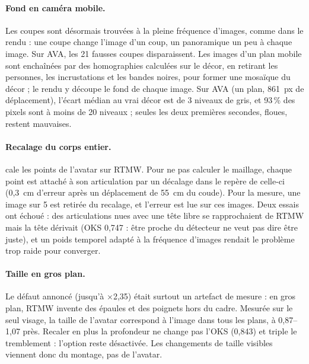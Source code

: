 \documentclass[11pt,a4paper]{report}
\newcommand{\code}[1]{\texttt{\detokenize{#1}}}
\begin{document}
\paragraph{Fond en caméra mobile.} Les coupes sont désormais trouvées à la pleine fréquence d'images, comme dans le rendu : une coupe
change l'image d'un coup, un panoramique un peu à chaque image. Sur AVA, les 21 fausses coupes disparaissent. Les images d'un plan mobile
sont enchaînées par des homographies calculées sur le décor, en retirant les personnes, les incrustations et les bandes noires, pour
former une mosaïque du décor ; le rendu y découpe le fond de chaque image. Sur AVA (un plan, 861~px de déplacement), l'écart médian au
vrai décor est de 3 niveaux de gris, et 93\,\% des pixels sont à moins de 20 niveaux ; seules les deux premières secondes, floues,
restent mauvaises.

\paragraph{Recalage du corps entier.} \code{body_refit.py} cale les points de l'avatar sur RTMW. Pour ne pas calculer le maillage,
chaque point est attaché à son articulation par un décalage dans le repère de celle-ci (0,3~cm d'erreur après un déplacement de 55~cm
du coude). Pour la mesure, une image sur 5 est retirée du recalage, et l'erreur est lue sur ces images. Deux essais ont échoué : des
articulations nues avec une tête libre se rapprochaient de RTMW mais la tête dérivait (OKS 0,747 : être proche du détecteur ne veut
pas dire être juste), et un poids temporel adapté à la fréquence d'images rendait le problème trop raide pour converger.

\paragraph{Taille en gros plan.} Le défaut annoncé (jusqu'à $\times$2,35) était surtout un artefact de mesure : en gros plan, RTMW
invente des épaules et des poignets hors du cadre. Mesurée sur le seul visage, la taille de l'avatar correspond à l'image dans tous les
plans, à 0,87--1,07 près. Recaler en plus la profondeur ne change pas l'OKS (0,843) et triple le tremblement : l'option reste
désactivée. Les changements de taille visibles viennent donc du montage, pas de l'avatar.
\end{document}

